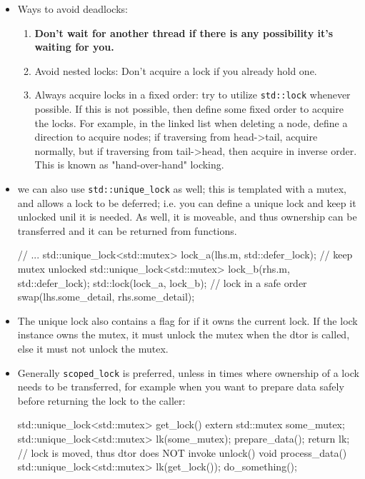 \documentclass[11pt, a4paper]{article}
\theoremstyle{definition}
\theoremstyle{remark}
\newcommand{\code}[1]{\lstinline|#1|}
\begin{document}
\begin{itemize}
    \item Ways to avoid deadlocks:
    \begin{enumerate}
        \item \textbf{Don't wait for another thread if there is any possibility it's waiting for you.}
        \item Avoid nested locks: Don't acquire a lock if you already hold one.
        \item Always acquire locks in a fixed order: try to utilize \code{std::lock} whenever possible. If this is not possible, then define some fixed order to acquire the locks. For example, in the linked list when deleting a node, define a direction to acquire nodes; if traversing from head->tail, acquire normally, but if traversing from tail->head, then acquire in inverse order. This is known as "hand-over-hand" locking.
    \end{enumerate}
    \item we can also use \code{std::unique_lock} as well; this is templated with a mutex, and allows a lock to be deferred; i.e. you can define a unique lock and keep it unlocked unil it is needed. As well, it is moveable, and thus ownership can be transferred and it can be returned from functions.
\begin{cppcode}
// ...
    std::unique_lock<std::mutex> lock_a(lhs.m, std::defer_lock); // keep mutex unlocked
    std::unique_lock<std::mutex> lock_b(rhs.m, std::defer_lock);
    std::lock(lock_a, lock_b); // lock in a safe order
    swap(lhs.some_detail, rhs.some_detail);
\end{cppcode}
    \item The unique lock also contains a flag for if it owns the current lock. If the lock instance owns the mutex, it must unlock the mutex when the dtor is called, else it must not unlock the mutex.
    \item Generally \code{scoped_lock} is preferred, unless in times where ownership of a lock needs to be transferred, for example when you want to prepare data safely before returning the lock to the caller:
\begin{cppcode}
std::unique_lock<std::mutex> get_lock() {
    extern std::mutex some_mutex;
    std::unique_lock<std::mutex> lk(some_mutex);
    prepare_data();
    return lk; // lock is moved, thus dtor does NOT invoke unlock()
}
void process_data() {
    std::unique_lock<std::mutex> lk(get_lock());
    do_something();
}
\end{cppcode}
\end{itemize}
\end{document}
